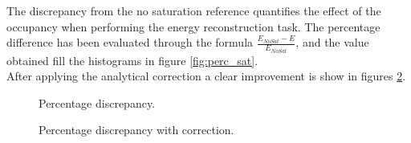 The discrepancy from the no saturation reference quantifies the effect of the occupancy when performing the energy reconstruction task. The percentage difference has been evaluated through the formula $\frac{E_{NoSat}-E}{E_{NoSat}}$, and the value obtained fill the histograms in figure \ref{fig:perc_sat}.\\
After applying the analytical correction a clear improvement is show in figures \ref{fig:sat_corr_perc}.\\

\begin{figure}
	\centering
	 \quad
	\caption{Percentage discrepancy.}
	\label{fig:sat_events}
\end{figure}

\begin{figure}
	\centering
	 \quad
	\caption{Percentage discrepancy with correction.}
		\label{fig:sat_corr_perc}
\end{figure}

